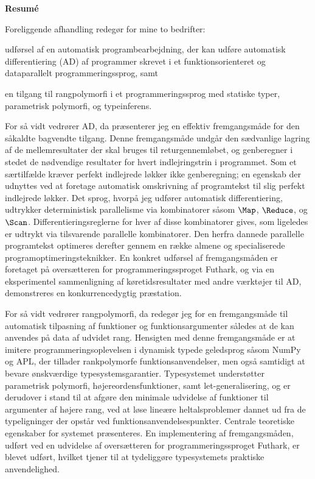 \newpage
\begin{center}
\textbf{Resum\'e}
\end{center}
Foreliggende afhandling redegør for mine to bedrifter:
\begin{enumerate*}[label=\arabic*)]
\item udførsel af en automatisk programbearbejdning, der kan udføre
  automatisk differentiering (AD) af programmer skrevet i et
  funktionsorienteret og dataparallelt programmeringssprog, samt
\item en tilgang til rangpolymorfi i et programmeringssprog med
  statiske typer, parametrisk polymorfi, og typeinferens.
\end{enumerate*}

For så vidt vedrører AD, da præsenterer jeg en effektiv fremgangsmåde
for den såkaldte bagvendte tilgang. Denne fremgangsmåde undgår den
sædvanlige lagring af de mellemresultater der skal bruges til
returgennemløbet, og genberegner i stedet de nødvendige resultater for
hvert indlejringstrin i programmet. Som et særtilfælde kræver perfekt
indlejrede løkker ikke genberegning; en egenskab der udnyttes ved at
foretage automatisk omskrivning af programtekst til slig perfekt
indlejrede løkker.
%
Det sprog, hvorpå jeg udfører automatisk differentiering, udtrykker
deterministisk parallelisme via kombinatorer såsom $\Map$,
$\Reduce$, og $\Scan$. Differentieringsreglerne for hver
af disse kombinatorer gives, som ligeledes er udtrykt via tilsvarende
parallelle kombinatorer. Den herfra dannede parallelle programtekst
optimeres derefter gennem en række almene og specialiserede
programoptimeringsteknikker.
%
En konkret udførsel af fremgangsmåden er foretaget på oversætteren for
programmeringssproget Futhark, og via en eksperimentel sammenligning
af køretidsresultater med andre værktøjer til AD, demonstreres en
konkurrencedygtig præstation.

For så vidt vedrører rangpolymorfi, da redegør jeg for en
fremgangsmåde til automatisk tilpasning af funktioner og
funktionsargumenter således at de kan anvendes på data af udvidet
rang. Hensigten med denne fremgangsmåde er at imitere
programmeringsoplevelsen i dynamisk typede geledsprog såsom NumPy og
APL, der tillader rankpolymorfe funktionsanvendelser, men også
samtidigt at bevare ønskværdige typesystemsgarantier. Typesystemet
understøtter parametrisk polymorfi, højereordensfunktioner, samt
let-generalisering, og er derudover i stand til at afgøre den minimale
udvidelse af funktioner til argumenter af højere rang, ved at løse
lineære heltalsproblemer dannet ud fra de typeligninger der opstår ved
funktionsanvendelsespunkter. Centrale teoretiske egenskaber for
systemet præsenteres. En implementering af fremgangsmåden, udført ved
en udvidelse af oversætteren for programmeringssproget Futhark, er
blevet udført, hvilket tjener til at tydeliggøre typesystemets
praktiske anvendelighed.
